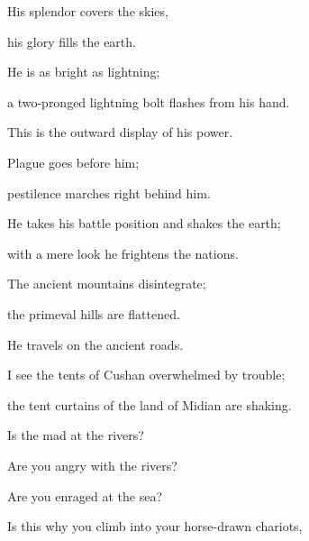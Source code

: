 {\par }{\Q His splendor covers
the skies,
\par }{\Q his glory
fills
the earth.
\par }{\Q {}He is as bright
as lightning;
\par }{\Q a two-pronged lightning bolt
flashes from his hand.
\par }{\Q This is the outward
display of his power.
\par }{\Q {}Plague
goes
before
him;
\par }{\Q pestilence
marches right behind him.
\par }{\Q {}He
takes
his battle position and shakes
the earth;
\par }{\Q with a mere look
he frightens
the nations.
\par }{\Q The ancient
mountains
disintegrate;
\par }{\Q the primeval hills
are
flattened.
\par }{\Q He travels on the ancient roads.
\par }{\Q {}I see
the tents
of Cushan
overwhelmed by trouble;
\par }{\Q the tent curtains
of the land
of Midian are shaking.
\par }{\Q {}Is the
{}
mad
at the rivers?
\par }{\Q Are you
angry
with the rivers?
\par }{\Q Are you
enraged
at the sea?

\par }{\Q Is this why
you climb
into
your horse-drawn
chariots,

}
